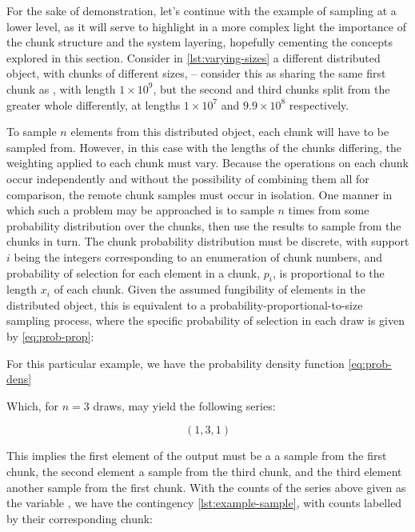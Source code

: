 For the sake of demonstration, let's continue with the example of sampling at a lower level, as it will serve to highlight in a more complex light the importance of the chunk structure and the system layering, hopefully cementing the concepts explored in this section.
Consider in \cref{lst:varying-sizes} a different distributed object, with chunks of different sizes,  -- consider this as sharing the same first chunk as , with length \(1 \times 10^9\), but the second and third chunks split from the greater whole differently, at lengths \(1 \times 10^7\) and \(9.9 \times 10^8\) respectively.


To sample \(n\) elements from this distributed object, each chunk will have to be sampled from.
However, in this case with the lengths of the chunks differing, the weighting applied to each chunk must vary.
Because the operations on each chunk occur independently and without the possibility of combining them all for comparison, the remote chunk samples must occur in isolation.
One manner in which such a problem may be approached is to sample \(n\) times from some probability distribution over the chunks, then use the results to sample from the chunks in turn.
The chunk probability distribution must be discrete, with support \(i\) being the integers corresponding to an enumeration of chunk numbers, and probability of selection for each element in a chunk, \(p_i\), is proportional to the length \(x_i\) of each chunk.
Given the assumed fungibility of elements in the distributed object, this is equivalent to a probability-proportional-to-size sampling process, where the specific probability of selection in each draw is given by \cref{eq:prob-prop}:


For this particular example, we have the probability density function \cref{eq:prob-dens}


Which, for \(n=3\) draws, may yield the following series:

\[ (1, 3, 1) \]

This implies the first element of the output must be a a sample from the first chunk, the second element a sample from the third chunk, and the third element another sample from the first chunk.
With the counts of the series above given as the variable , we have the contingency \cref{lst:example-sample}, with counts labelled by their corresponding chunk:

